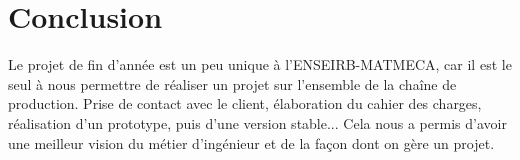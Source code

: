 \chapter*{Conclusion}

Le projet de fin d'année est un peu unique à l'ENSEIRB-MATMECA, car il est le seul à nous permettre de réaliser un projet sur l'ensemble de la chaîne de production. Prise de contact avec le client, élaboration du cahier des charges, réalisation d'un prototype, puis d'une version stable... Cela nous a permis d'avoir une meilleur vision du métier d'ingénieur et de la façon dont on gère un projet.
